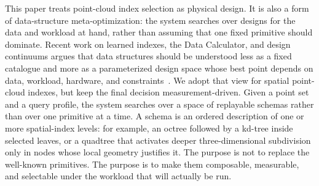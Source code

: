 This paper treats point-cloud index selection as physical design. It is also a form of data-structure meta-optimization: the system searches over designs for the data and workload at hand, rather than assuming that one fixed primitive should dominate. Recent work on learned indexes, the Data Calculator, and design continuums argues that data structures should be understood less as a fixed catalogue and more as a parameterized design space whose best point depends on data, workload, hardware, and constraints~\cite{kraska2018learned,idreos2018datacalculator,idreos2019learningkv}. We adopt that view for spatial point-cloud indexes, but keep the final decision measurement-driven. Given a point set and a query profile, the system searches over a space of replayable schemas rather than over one primitive at a time. A schema is an ordered description of one or more spatial-index levels: for example, an octree followed by a kd-tree inside selected leaves, or a quadtree that activates deeper three-dimensional subdivision only in nodes whose local geometry justifies it. The purpose is not to replace the well-known primitives. The purpose is to make them composable, measurable, and selectable under the workload that will actually be run.

